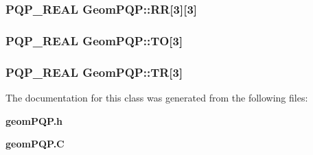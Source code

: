 \subsubsection{\setlength{\rightskip}{0pt plus 5cm}PQP\_\-REAL Geom\-PQP::RR[3][3]\hspace{0.3cm}{\tt  [protected]}}\label{classGeomPQP_n0}


\subsubsection{\setlength{\rightskip}{0pt plus 5cm}PQP\_\-REAL Geom\-PQP::TO[3]\hspace{0.3cm}{\tt  [protected]}}\label{classGeomPQP_n3}


\subsubsection{\setlength{\rightskip}{0pt plus 5cm}PQP\_\-REAL Geom\-PQP::TR[3]\hspace{0.3cm}{\tt  [protected]}}\label{classGeomPQP_n2}




The documentation for this class was generated from the following files:\begin{CompactItemize}
\item 
{\bf geom\-PQP.h}\item 
{\bf geom\-PQP.C}\end{CompactItemize}

